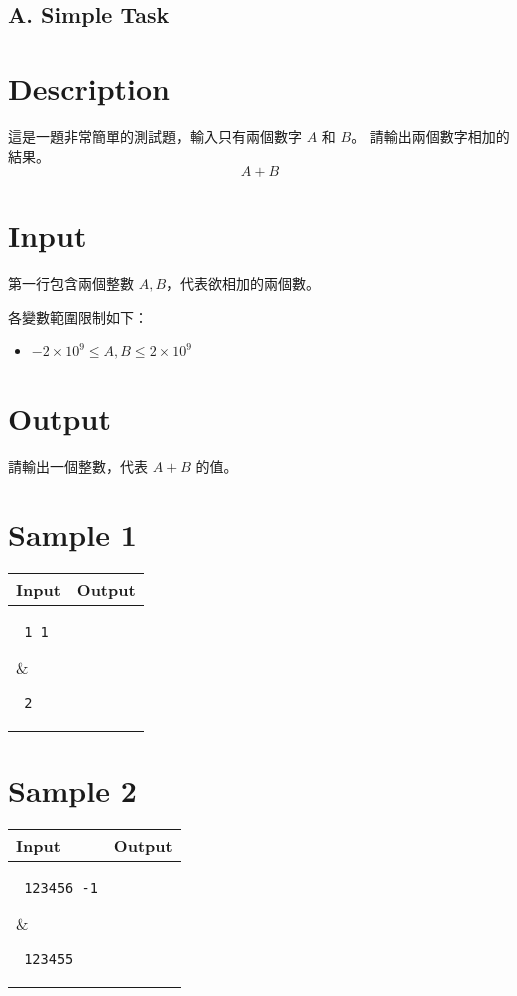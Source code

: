 \documentclass[11pt,a4paper]{article}
\begin{document}
\begin{center}
\section*{A. Simple Task}
\end{center}

\section*{Description}

這是一題非常簡單的測試題，輸入只有兩個數字 $A$ 和 $B$。
請輸出兩個數字相加的結果。
$$
	A + B
$$

\section*{Input}

第一行包含兩個整數 $A, B$，代表欲相加的兩個數。

各變數範圍限制如下：
\begin{itemize}
	\item $-2\times 10^9 \le A, B \le 2\times 10^9$ 
\end{itemize}

\section*{Output}

請輸出一個整數，代表 $A + B$ 的值。

\section*{Sample 1}
\begin{longtable}[!h]{|p{}|p{}|}
\hline
\textbf {Input}	& \textbf {Output} \\
\hline
\parbox[t]{0.5\textwidth} %
{ \tt
1 1 \\
} &
\parbox[t]{0.5\textwidth}
{ \tt
2 \\
} \\
\hline
\end{longtable}

\section*{Sample 2}
\begin{longtable}[!h]{|p{}|p{}|}
\hline
\textbf {Input}	& \textbf {Output} \\
\hline
\parbox[t]{0.5\textwidth} %
{ \tt
123456 -1 \\ 
} &
\parbox[t]{0.5\textwidth}
{ \tt
123455 \\
} \\
\hline
\end{longtable}
\end{document}
